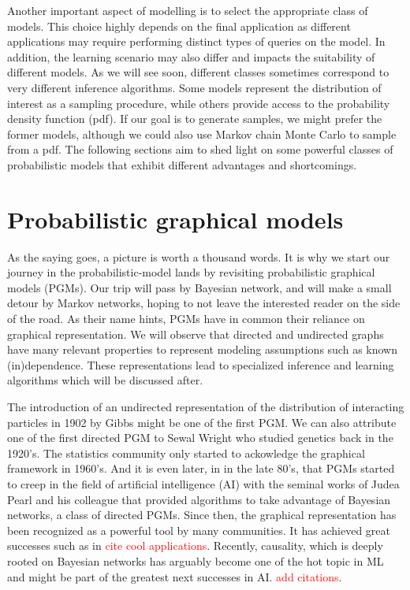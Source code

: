 Another important aspect of modelling is to select the appropriate class of models. This choice highly depends on the final application as different applications may require performing distinct types of queries on the model. In addition, the learning scenario may also differ and impacts the suitability of different models. As we will see soon, different classes sometimes correspond to very different inference algorithms. Some models represent the distribution of interest as a sampling procedure, while others provide access to the probability density function (pdf). If our goal is to generate samples, we might prefer the former models, although we could also use Markov chain Monte Carlo to sample from a pdf. The following sections aim to shed light on some powerful classes of probabilistic models that exhibit different advantages and shortcomings.

%

\section{Probabilistic graphical models}

As the saying goes, a picture is worth a thousand words. It is why we start our journey in the probabilistic-model lands by revisiting probabilistic graphical models (PGMs). Our trip will pass by Bayesian network, and will make a small detour by Markov networks, hoping to not leave the interested reader on the side of the road. As their name hints, PGMs have in common their reliance on graphical representation. We will observe that directed and undirected graphs have many relevant properties to represent modeling assumptions such as known (in)dependence. These representations lead to specialized inference and learning algorithms which will be discussed after.

The introduction of an undirected representation of the distribution of interacting particles in 1902 by Gibbs might be one of the first PGM. We can also attribute one of the first directed PGM to Sewal Wright who studied genetics back in the 1920's. The statistics community only started to ackowledge the graphical framework in 1960's. And it is even later, in in the late 80's, that PGMs started to creep in the field of artificial intelligence (AI) with the seminal works of Judea Pearl and his colleague that provided algorithms to take advantage of Bayesian networks, a class of directed PGMs. Since then, the graphical representation has been recognized as a powerful tool by many communities. It has achieved great successes such as in \textcolor{red}{cite cool applications}. Recently, causality, which is deeply rooted on Bayesian networks has arguably become one of the hot topic in ML and might be part of the greatest next successes in AI. \textcolor{red}{add citations}.

